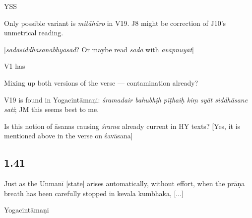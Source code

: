 \begin{ekdosis}
\begin{testimonia}[hp01_040]
YSS

\begin{versinnote}
\end{versinnote}

\end{testimonia}

\begin{philcomm}[hp01_040]
Only possible variant is \emph{mitāhāro} in V19.
J8 might be correction of J10’s unmetrical reading.

[\emph{sadāsiddhāsanābhyāsād}? Or maybe read \emph{sadā} with \emph{avāpnuyāt}]

V1 has

\begin{versinnote}
\end{versinnote}

Mixing up both versions of the verse — contamination already?

V19 is found in Yogacintāmaṇi: \emph{śramadair bahubhịh pīṭhaiḥ kiṃ syāt siddhāsane sati}; JM this seems best to me.

Is this notion of āsanas causing \emph{śrama} already current in HY texts?
[Yes, it is mentioned above in the verse on śavāsana]
\end{philcomm}


\subsection*{1.41}
\begin{translation}[hp01_041]
Just as the Unmanī [state] arises automatically, without effort, when the prāṇa breath has been carefully stopped in kevala kumbhaka, [...]
\end{translation}

\begin{sources}[hp01_041]
\end{sources}

\begin{testimonia}[hp01_041]
Yogacintāmaṇi

\begin{versinnote}
\end{versinnote}


\end{testimonia}
\end{ekdosis}
